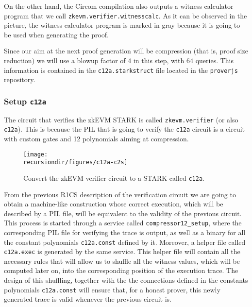 On the other hand, the Circom compilation also outputs a witness calculator program that we call \texttt{zkevm.verifier.witnesscalc}. As it can be observed in the picture, the witness calculator program is marked in gray because it is going to be used when generating the proof.

Since our aim at the next proof generation will be compression (that is, proof size reduction) we will use a blowup factor of $4$ in this step, with $64$ queries. This information is contained in the \texttt{c12a.starkstruct} file located in the \texttt{proverjs} repository.



\subsubsection{Setup \ctos \texttt{c12a}}

The circuit that verifies the zkEVM STARK is called \texttt{zkevm.verifier} (or also \texttt{c12a}). This is because the PIL that is going to verify the \texttt{c12a} circuit is a  circuit with custom gates and 12 polynomials aiming at compression. 

\begin{figure}[H]
\centering
\texttt{[image: \\recursiondir/figures/c12a-c2s]}
\caption{Convert the zkEVM verifier circuit to a STARK called \texttt{c12a}.}
\label{fig:zkevm-verifier-c2s}
\end{figure}

From the previous R1CS description of the verification circuit we are going to obtain a machine-like construction whose correct execution, which will be described by a PIL file, will be equivalent to the validity of the previous circuit. This process is started through a service called \texttt{compressor12\_setup}, where the corresponding PIL file for verifying the trace is output, as well as a binary for all the constant polynomials \texttt{c12a.const} defined by it. Moreover, a helper file called \texttt{c12a.exec} is generated by the same service. This helper file will contain all the necessary rules that will allow us to shuffle all the witness values, which will be computed later on, into the corresponding position of the execution trace. The design of this shuffling, together with the the connections defined in the constants polynomials \texttt{c12a.const} will ensure that, for a honest prover, this newly generated trace is valid whenever the previous circuit is. 

